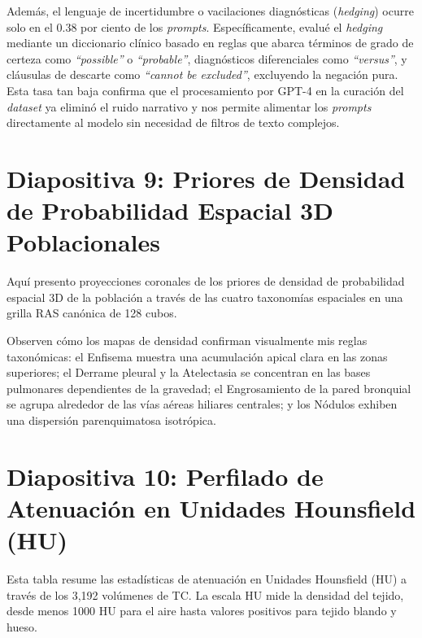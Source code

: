 \documentclass[11pt, a4paper]{article}
\begin{document}
Además, el lenguaje de incertidumbre o vacilaciones diagnósticas (\textit{hedging}) ocurre solo en el 0.38 por ciento de los \textit{prompts}. Específicamente, evalué el \textit{hedging} mediante un diccionario clínico basado en reglas que abarca términos de grado de certeza como \textit{``possible''} o \textit{``probable''}, diagnósticos diferenciales como \textit{``versus''}, y cláusulas de descarte como \textit{``cannot be excluded''}, excluyendo la negación pura. Esta tasa tan baja confirma que el procesamiento por GPT-4 en la curación del \textit{dataset} ya eliminó el ruido narrativo y nos permite alimentar los \textit{prompts} directamente al modelo sin necesidad de filtros de texto complejos.

\bigskip

\section{Diapositiva 9: Priores de Densidad de Probabilidad Espacial 3D Poblacionales}

Aquí presento proyecciones coronales de los priores de densidad de probabilidad espacial 3D de la población a través de las cuatro taxonomías espaciales en una grilla RAS canónica de 128 cubos.

Observen cómo los mapas de densidad confirman visualmente mis reglas taxonómicas: el Enfisema muestra una acumulación apical clara en las zonas superiores; el Derrame pleural y la Atelectasia se concentran en las bases pulmonares dependientes de la gravedad; el Engrosamiento de la pared bronquial se agrupa alrededor de las vías aéreas hiliares centrales; y los Nódulos exhiben una dispersión parenquimatosa isotrópica.

\bigskip

\section{Diapositiva 10: Perfilado de Atenuación en Unidades Hounsfield (HU)}

Esta tabla resume las estadísticas de atenuación en Unidades Hounsfield (HU) a través de los 3,192 volúmenes de TC. La escala HU mide la densidad del tejido, desde menos 1000 HU para el aire hasta valores positivos para tejido blando y hueso.
\end{document}
